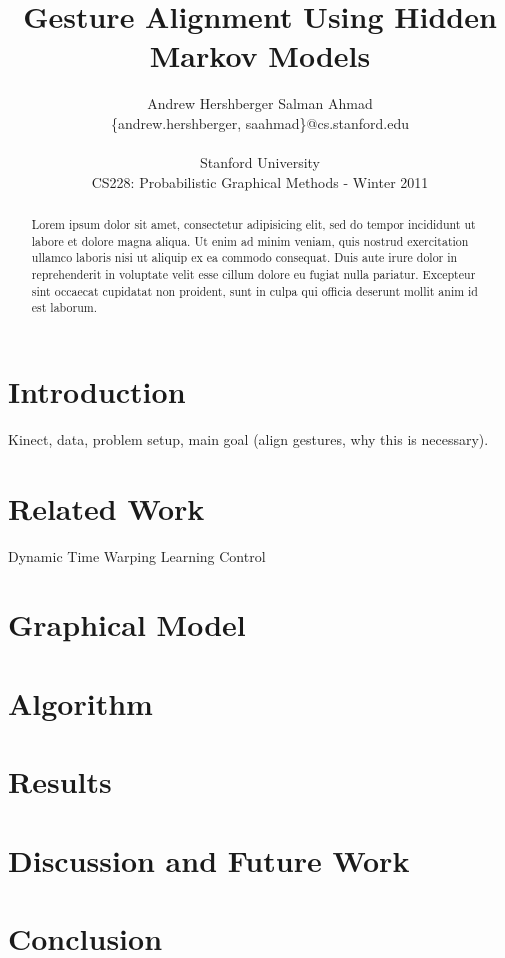 \documentclass{article}
\title{Gesture Alignment Using Hidden Markov Models}
\author{
Andrew Hershberger
\quad Salman Ahmad \\
\{andrew.hershberger, saahmad\}@cs.stanford.edu
\\\\
Stanford University\\
CS228: Probabilistic Graphical Methods - Winter 2011\\
}
\begin{document}
\maketitle

\begin{abstract}


Lorem ipsum dolor sit amet, consectetur adipisicing elit, sed do 
tempor incididunt ut labore et dolore magna aliqua. Ut enim ad minim veniam,
quis nostrud exercitation ullamco laboris nisi ut aliquip ex ea commodo
consequat. Duis aute irure dolor in reprehenderit in voluptate velit esse
cillum dolore eu fugiat nulla pariatur. Excepteur sint occaecat cupidatat non
proident, sunt in culpa qui officia deserunt mollit anim id est laborum.

\end{abstract}

\section{Introduction}
Kinect, data, problem setup, main goal (align gestures, why this is necessary).

\section{Related Work}

Dynamic Time Warping \cite{Listgarten2005}
Learning Control \cite{Coates2008}

\section{Graphical Model}

\section{Algorithm}

\section{Results}

\section{Discussion and Future Work}

\section{Conclusion}





\end{document}
